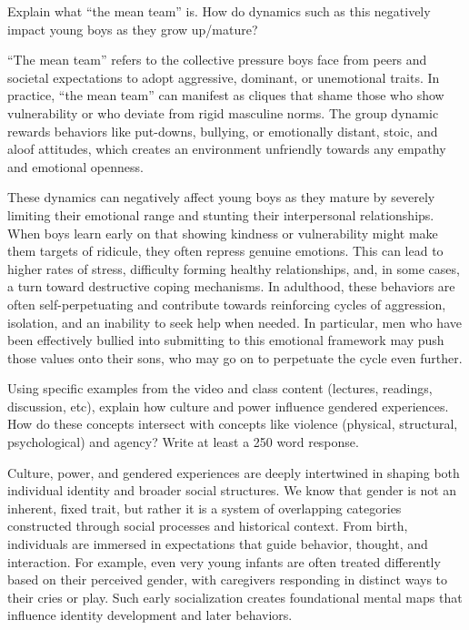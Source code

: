 \documentclass{article}
\begin{document}
\begin{prompt}
  Explain what ``the mean team'' is. How do dynamics such as this negatively impact young boys as they grow up/mature?
\end{prompt}

``The mean team'' refers to the collective pressure boys face from peers and societal expectations to adopt aggressive, dominant, or unemotional traits.
In practice, ``the mean team'' can manifest as cliques that shame those who show vulnerability or who deviate from rigid masculine norms.
The group dynamic rewards behaviors like put-downs, bullying, or emotionally distant, stoic, and aloof attitudes, which creates an environment unfriendly towards any empathy and emotional openness.

These dynamics can negatively affect young boys as they mature by severely limiting their emotional range and stunting their interpersonal relationships.
When boys learn early on that showing kindness or vulnerability might make them targets of ridicule, they often repress genuine emotions.
This can lead to higher rates of stress, difficulty forming healthy relationships, and, in some cases, a turn toward destructive coping mechanisms.
In adulthood, these behaviors are often self-perpetuating and contribute towards reinforcing cycles of aggression, isolation, and an inability to seek help when needed.
In particular, men who have been effectively bullied into submitting to this emotional framework may push those values onto their sons, who may go on to perpetuate the cycle even further.

\begin{prompt}
  Using specific examples from the video and class content (lectures, readings, discussion, etc), explain how culture and power influence gendered experiences. How do these concepts intersect with concepts like violence (physical, structural, psychological) and agency? Write at least a 250 word response.
\end{prompt}

Culture, power, and gendered experiences are deeply intertwined in shaping both individual identity and broader social structures.
We know that gender is not an inherent, fixed trait, but rather it is a system of overlapping categories constructed through social processes and historical context.
From birth, individuals are immersed in expectations that guide behavior, thought, and interaction.
For example, even very young infants are often treated differently based on their perceived gender, with caregivers responding in distinct ways to their cries or play.
Such early socialization creates foundational mental maps that influence identity development and later behaviors.
\end{document}
